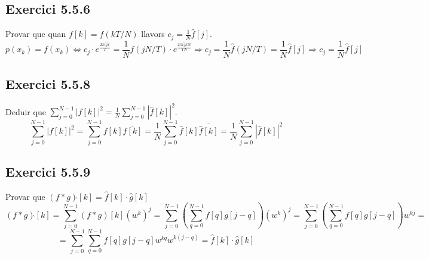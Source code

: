\documentclass[a4paper, 11pt]{article}
\begin{document}
\subsection{Exercici 5.5.6}
Provar que quan $f[k] = f(kT/N)$ llavors $c_j = \frac{1}{N} \hat{f}[j]$.\\
$$ p(x_k) = f(x_k) \Longleftrightarrow c_j \cdot e^{\frac{2\pi ijx}{T}} = \frac{1}{N} \hat{f}(jN/T) \cdot e^{\frac{2\pi ijkN}{TN}} \Longrightarrow c_j = \frac{1}{N} \hat{f}(jN/T) = \frac{1}{N} \hat{f}[j] \Longrightarrow c_j = \frac{1}{N} \hat{f}[j] $$
\subsection{Exercici 5.5.8}
Deduir que $\sum_{j = 0}^{N-1} |f[k]|^2 = \frac{1}{N} \sum_{j = 0}^{N-1} |\hat{f}[k]|^2$.
$$ \sum_{j = 0}^{N-1} |f[k]|^2 = \sum_{j = 0}^{N-1} f[k]\overline{f[k]} = \frac{1}{N} \sum_{j = 0}^{N-1} \hat{f}[k] \overline{\hat{f}[k]} = \frac{1}{N} \sum_{j = 0}^{N-1} |\hat{f}[k]|^2 $$
\subsection{Exercici 5.5.9}
Provar que $(f*g)\hat{}[k] = \hat{f}[k] \cdot \hat{g}[k] $
$$ (f*g)\hat{}[k] = \sum_{j = 0}^{N-1} (f*g)[k] (w^k)^j = \sum_{j = 0}^{N-1} \left( \sum_{q = 0}^{N-1} f[q]g[j-q] \right) (w^k)^j = \sum_{j = 0}^{N-1} \left( \sum_{q = 0}^{N-1} f[q]g[j-q] \right) w^{kj} =$$ $$= \sum_{j = 0}^{N-1} \sum_{q = 0}^{N-1} f[q]g[j-q] w^{kq} w^{k(j-q)} = \hat{f}[k] \cdot \hat{g}[k] $$
\newpage
\end{document}
